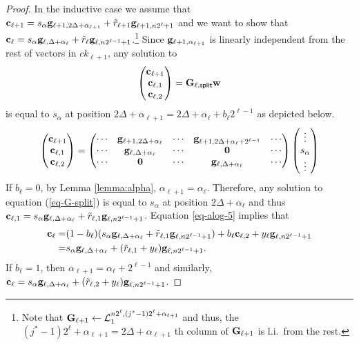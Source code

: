 \begin{proof}
In the inductive case we assume that \(\mathbf{c}_{\ell+1}=s_{\alpha}\mathbf{g}_{\ell+1,2\Delta+\alpha_{\ell+1}}+\tilde{r}_{\ell+1}\mathbf{g}_{\ell+1,n2^\ell+1}\) and we want to show that $\mathbf{c}_\ell = s_\alpha\mathbf{g}_{\ell,\Delta+\alpha_\ell}+\tilde{r}_\ell\mathbf{g}_{\ell,n2^{\ell-1}+1}$.\footnote{Note that $\mathbf{{G}}_{\ell+1}\gets\mathcal{L}_1^{n2^\ell, (j^*-1)2^\ell+\alpha_{\ell+1}}$ and thus, the $(j^*-1)2^\ell+\alpha_{\ell+1}=2\Delta+\alpha_{\ell+1}$ th column of $\mathbf{{G}}_{\ell+1}$ is l.i.~from the rest.} Since \(\mathbf{g}_{\ell+1,\alpha_{\ell+1}}\) is linearly independent from the rest of vectors in \(ck_{\ell+1}\), any solution to 
\begin{equation}
\begin{pmatrix}\mathbf{c}_{\ell+1}\\\mathbf{c}_{\ell,1}\\\mathbf{c}_{\ell,2}\end{pmatrix}=\mathbf{{G}}_{\ell,\mathsf{split}}\mathbf{w} \label{eq-G-split}
\end{equation}
is equal to \(s_{\alpha}\) at position \(2\Delta+\alpha_{\ell+1}=2\Delta+\alpha_\ell+b_\ell2^{\ell-1}\) as depicted below.
\begin{align*}
\left(\begin{matrix}\mathbf{c}_{\ell+1}\\\mathbf{c}_{\ell,1}\\\mathbf{c}_{\ell,2}\end{matrix}\right)=
\left(\begin{matrix}
\cdots & \mathbf{g}_{\ell+1,2\Delta+\alpha_\ell} & \cdots  & \mathbf{g}_{\ell+1,2\Delta+\alpha_\ell+2^{\ell-1}} & \cdots\\
\cdots & \mathbf{g}_{\ell,\Delta+\alpha_\ell}     & \cdots  & \mathbf{0}                           & \cdots\\
\cdots & \mathbf{0}                        & \cdots  & \mathbf{g}_{\ell,\Delta+\alpha_\ell}        & \cdots
\end{matrix}\right)
\left(\begin{matrix}\vdots\\s_\alpha\\\vdots\end{matrix}\right)
\end{align*}
If $b_{\ell}=0$, by Lemma \ref{lemma:alpha}, $\alpha_{\ell+1}=\alpha_\ell$. Therefore, any solution to equation (\ref{eq-G-split})
 is equal to $s_\alpha$ at position $2\Delta+\alpha_\ell$ and thus $\mathbf{c}_{\ell,1} = s_\alpha\mathbf{g}_{\ell,\Delta+\alpha_\ell}+\tilde{r}_{\ell,1}\mathbf{g}_{\ell,n2^{\ell-1}+1}$.
Equation \ref{eq-alog-5} implies that
\begin{align*}
\mathbf{c}_{\ell}=&(1-b_\ell)(s_\alpha\mathbf{g}_{\ell,\Delta+\alpha_\ell}+\tilde{r}_{\ell,1}\mathbf{g}_{\ell,n2^{\ell-1}+1})+b_\ell\mathbf{c}_{\ell,2}+y_\ell\mathbf{g}_{\ell,n2^{\ell-1}+1}\\
               =& s_\alpha\mathbf{g}_{\ell,\Delta+\alpha_\ell}+(\tilde{r}_{\ell,1}+y_\ell)\mathbf{g}_{\ell,n2^{\ell-1}+1}.
\end{align*}
If $b_{\ell}=1$, then $\alpha_{\ell+1}=\alpha_\ell+2^{\ell-1}$ and similarly, $\mathbf{c}_{\ell}=s_\alpha\mathbf{g}_{\ell,\Delta+\alpha_\ell}+(\tilde{r}_{\ell,2}+y_\ell)\mathbf{g}_{\ell,n2^{\ell-1}+1}$.

\end{proof}
